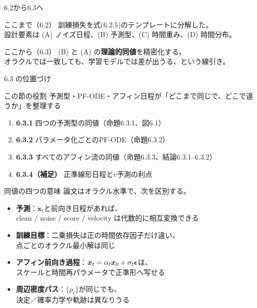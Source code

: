 

\begin{frame}{6.2から6.3へ}
    \begin{block}{ここまで（6.2）}
        訓練損失を式(6.2.5)のテンプレートに分解した。\\
        設計要素は (A) ノイズ日程、(B) 予測型、(C) 時間重み、(D) 時間分布。
    \end{block}
    \begin{block}{ここから（6.3）}
        (B) と (A) の\textbf{理論的同値}を精密化する。\\
        オラクルでは一致しても、学習モデルでは差が出うる、という線引き。
    \end{block}
\end{frame}
\asmain
\begin{frame}{6.3 の位置づけ}
    \begin{block}{この節の役割}
        予測型・PF-ODE・アフィン日程が「どこまで同じで、どこで違うか」を整理する
    \end{block}
    \begin{enumerate}
        \item \textbf{6.3.1} 四つの予測型の同値（命題6.3.1、図6.1）
        \item \textbf{6.3.2} パラメータ化ごとのPF-ODE（命題6.3.2）
        \item \textbf{6.3.3} すべてのアフィン流の同値（命題6.3.3、結論6.3.1--6.3.2）
        \item \textbf{6.3.4（補足）} 正準線形日程と$v$予測の利点
    \end{enumerate}
\end{frame}
\asmain
\begin{frame}{同値の四つの意味}
    論文はオラクル水準で、次を区別する。
    \begin{itemize}
        \item \textbf{予測}：$\bm{x}_t$と前向き日程があれば、\\
        clean / noise / score / velocity は代数的に相互変換できる
        \item \textbf{訓練目標}：二乗損失は正の時間依存因子だけ違い、\\
        点ごとのオラクル最小解は同じ
        \item \textbf{アフィン前向き過程}：$\bm{x}_t=\alpha_t\bm{x}_0+\sigma_t\bm{\epsilon}$は、\\
        スケールと時間再パラメータで正準形へ写せる
        \item \textbf{周辺密度パス}：$\{p_t\}$が同じでも、\\
        決定／確率力学や軌跡は異なりうる
    \end{itemize}
\end{frame}
